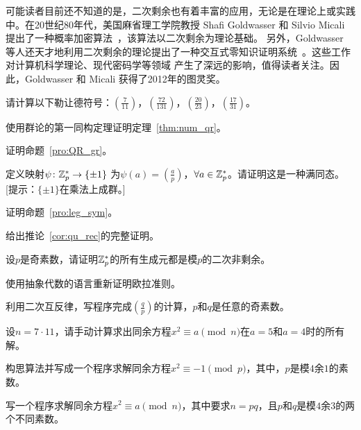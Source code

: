  可能读者目前还不知道的是，二次剩余也有着丰富的应用，无论是在理论上或实践中。在20世纪80年代，美国麻省理工学院教授 Shafi Goldwasser 和 Silvio Micali
 提出了一种概率加密算法~\cite{GM84}，该算法以二次剩余为理论基础。
 另外，Goldwasser 等人还天才地利用二次剩余的理论提出了一种交互式零知识证明系统~\cite{GMR89}。这些工作对计算机科学理论、现代密码学等领域
 产生了深远的影响，值得读者关注。因此，Goldwasser 和 Micali 获得了2012年的图灵奖。
 
 \begin{problemset}
 \item 请计算以下勒让德符号：$(\frac{7}{11})$，$(\frac{72}{131})$，$(\frac{20}{23})$，$(\frac{17}{31})$。%
 
 \item 使用群论的第一同构定理证明定理~\ref{thm:num_qr}。
 
 \item 证明命题~\ref{pro:QR_gr}。
 
 \item 定义映射$\psi\colon {\mathbb Z}_p^* \to \{ \pm 1 \}$
  为$\psi(a) =  \left(\frac{a}{p}\right)$，$\forall a \in {\mathbb Z}_p^*$。请证明这是一种满同态。[提示：$\{ \pm 1 \}$在乘法上成群。]
 
 \item 证明命题~\ref{pro:leg_sym}。
 
 \item 给出推论~\ref{cor:qu_rec}的完整证明。
 
 \item 设$p$是奇素数，请证明${\mathbb Z}_p^*$的所有生成元都是模$p$的二次非剩余。%
  
 \item 使用抽象代数的语言重新证明欧拉准则。
 
 \item  利用二次互反律，写程序完成$\left(\frac{q}{p}\right)$的计算，$p$和$q$是任意的奇素数。
 
 \item 设$n = 7 \cdot 11$，请手动计算求出同余方程$x^2 \equiv a \pmod{n}$在$a = 5$和$a = 4$时的所有解。%
 
 \item 构思算法并写成一个程序求解同余方程$x^2 \equiv -1 \pmod{p}$，其中，$p$是模$4$余$1$的素数。
 
 \item 写一个程序求解同余方程$x^2 \equiv a \pmod{n}$，其中要求$n = pq$，且$p$和$q$是模$4$余$3$的两个不同素数。 
 

\end{problemset}
